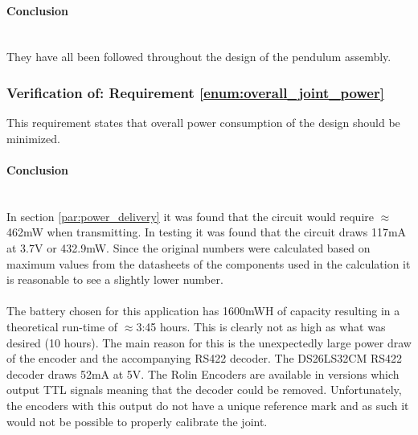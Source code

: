 \paragraph{Conclusion}~\\
They have all been followed throughout the design of the pendulum assembly.

\subsubsection{Verification of: Requirement \ref{enum:overall_joint_power}} %
\label{ssub:verification_of_requirement_enum:overall_joint_power}
This requirement states that overall power consumption of the design should be minimized.

\paragraph{Conclusion}~\\
In section \ref{par:power_delivery} it was found that the circuit would require $\approx$462mW when transmitting.
In testing it was found that the circuit draws 117mA at 3.7V or 432.9mW.
Since the original numbers were calculated based on maximum values from the datasheets of the components used in the calculation it is reasonable to see a slightly lower number.
\\~\\
The battery chosen for this application has 1600mWH of capacity resulting in a theoretical run-time of $\approx$3:45 hours.
This is clearly not as high as what was desired (10 hours).
The main reason for this is the unexpectedly large power draw of the encoder and the accompanying RS422 decoder.
The DS26LS32CM RS422 decoder draws 52mA at 5V.
The Rolin Encoders are available in versions which output TTL signals meaning that the decoder could be removed. 
Unfortunately, the encoders with this output do not have a unique reference mark and as such it would not be possible to properly calibrate the joint.